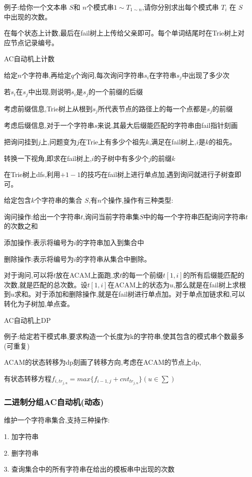 \documentclass[a4paper,fontset=none]{ctexart}
\begin{document}
例子:给你一个文本串 $S$和 $n$个模式串$1∼T_{1∼n}$,请你分别求出每个模式串 $T_i$ 在 $S$中出现的次数。

在每个状态上计数,最后在fail树上上传给父亲即可。每个单词结尾时在Trie树上对应节点记录编号。

AC自动机上计数

给定$n$个字符串,再给定$q$个询问,每次询问字符串$s_i$在字符串$s_j$中出现了多少次

若$s_i$在$s_j$中出现,则说明$s_i$是$s_j$的一个前缀的后缀

考虑前缀信息,Trie树上从根到$s_j$所代表节点的路径上的每一个点都是$s_j$的前缀

考虑后缀信息,对于一个字符串$s$来说,其最大后缀能匹配的字符串由fail指针刻画

把询问挂到$j$上,问题变为$j$在Trie上有多少个祖先$k$,满足在fail树上,$i$是$k$的祖先。

转换一下视角,即求在fail树上,$i$的子树中有多少个$j$的前缀$k$

在Trie树上dfs,利用$+1 -1$的技巧在fail树上进行单点加,遇到询问就进行子树查即可。

给定包含$k$个字符串的集合 $S$,有$n$个操作,操作有三种类型:

询问操作:给出一个字符串$t$,询问当前字符串集$S$中的每一个字符串匹配询问字符串$t$的次数之和

添加操作:表示将编号为$i$的字符串加入到集合中

删除操作:表示将编号为$i$的字符串从集合中删除。

对于询问,可以将$t$放在ACAM上面跑,求$t$的每一个前缀$t[1,i]$的所有后缀能匹配的次数,就是匹配的总次数。设$t[1,i]$在ACAM上的状态为$u$,那么就是在fail树上求根到$u$求和。对于添加和删除操作,就是在fail树进行单点加。对于单点加链求和,可以转化为子树加,单点查。

AC自动机上DP

例子:给定若干模式串,要求构造一个长度为k的字符串,使其包含的模式串个数最多(可重复)

ACAM的状态转移为dp刻画了转移方向,考虑在ACAM的节点上dp,

有状态转移方程$f_{i,tr_{j,u}}=max\{f_{i-1,j}+cnt_{tr_{j,u}}\}(u\in \sum)$ 
\subsubsection{二进制分组AC自动机(动态)}

维护一个字符串集合,支持三种操作:

1. 加字符串

2. 删字符串

3. 查询集合中的所有字符串在给出的模板串中出现的次数
\end{document}
